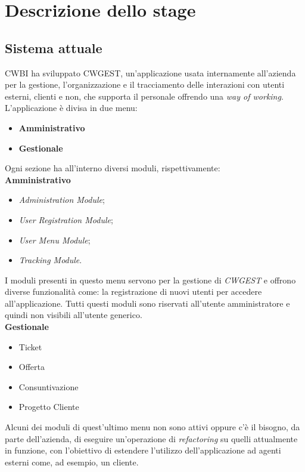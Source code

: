 \chapter{Descrizione dello stage}

\section{Sistema attuale}
CWBI ha sviluppato CWGEST\glsfirstoccur , un'applicazione usata internamente all'azienda per la gestione, l'organizzazione e il tracciamento delle interazioni con utenti esterni, clienti e non, che supporta il personale offrendo una \textit{way of working}. \\
L'applicazione è divisa in due menu:
\begin{itemize}
	\item \textbf{Amministrativo}
	\item \textbf{Gestionale}
\end{itemize}
Ogni sezione ha all'interno diversi moduli, rispettivamente:\\
\textbf{Amministrativo}
\begin{itemize}
\item \textit{Administration Module};
\item \textit{User Registration Module};
\item \textit{User Menu Module};
\item \textit{Tracking Module}.
\end{itemize}
I moduli presenti in questo menu servono per la gestione di \textit{CWGEST} e offrono diverse funzionalità come: la registrazione di nuovi utenti per accedere all'applicazione. Tutti questi moduli sono riservati all'utente amministratore e quindi non visibili all'utente generico. \\
\textbf{Gestionale}
\begin{itemize}
\item Ticket 
\item Offerta
\item Consuntivazione
\item Progetto Cliente
\end{itemize}
Alcuni dei moduli di quest'ultimo menu non sono attivi oppure c'è il bisogno, da parte dell'azienda, di eseguire un'operazione di \textit{refactoring\glsfirstoccur}\; su quelli attualmente in funzione, con l'obiettivo di estendere l'utilizzo dell'applicazione ad agenti esterni come, ad esempio, un cliente. 

